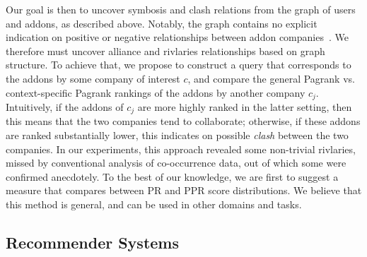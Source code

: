 \documentclass[ijoc,nonblindrev]{informs3} %
\numberwithin{equation}{subsection}
\begin{document}
Our goal is then to uncover symbosis and clash relations from the graph of users and addons, as described above. Notably, the graph contains no explicit indication on positive or negative relationships between addon companies~\citep{kunegisWWW08,kerchoveICDM08}. We therefore must uncover alliance and rivlaries relationships based on graph structure. To achieve that, we propose to construct a query that corresponds to the addons by some company of interest $c$, and compare the general Pagrank vs. context-specific Pagrank rankings of the addons by another company $c_j$. Intuitively, if the addons of $c_j$ are more highly ranked in the latter setting, then this means that the two companies tend to collaborate; otherwise, if these addons are ranked substantially lower, this indicates on possible {\it clash} between the two companies. In our experiments, this approach revealed some non-trivial rivlaries, missed by conventional analysis of co-occurrence data, out of which some were confirmed anecdotely. To the best of our knowledge, we are first to suggest a measure that compares between PR and PPR score distributions. We believe that this method is general, and can be used in other domains and tasks. 

\iffalse
\subsection{Recommender Systems}
\label{sec:recommender_systems}
\end{document}
